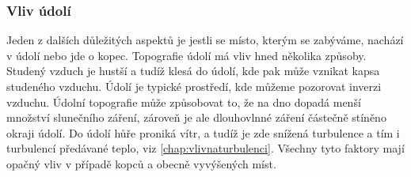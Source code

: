 \subsubsection{Vliv údolí}
Jeden z dalších důležitých aspektů je jestli se místo, kterým se zabýváme, nachází v údolí nebo jde o kopec. Topografie údolí má vliv hned několika způsoby. Studený vzduch je hustší a tudíž klesá do údolí, kde pak může vznikat kapsa studeného vzduchu. Údolí je typické prostředí, kde můžeme pozorovat inverzi vzduchu. Údolní topografie může způsobovat to, že na dno dopadá menší množství slunečního záření, zároveň je ale dlouhovlnné záření částečně stíněno okraji údolí. Do údolí hůře proniká vítr, a tudíž je zde snížená turbulence a tím i turbulencí předávané teplo, viz \ref{chap:vlivnaturbulenci}. Všechny tyto faktory mají opačný vliv v případě kopců a obecně vyvýšených míst\cite{alma}. 





